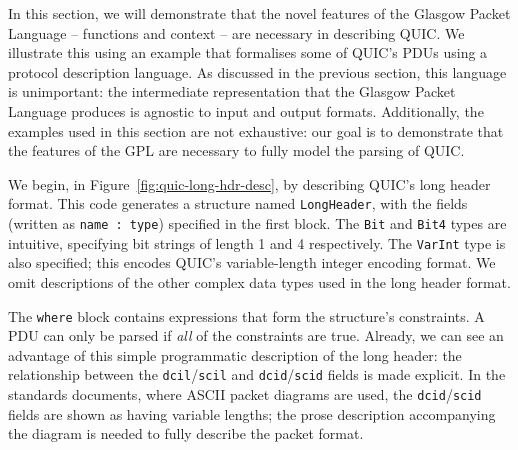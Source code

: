 \documentclass[10pt,sigconf]{acmart}
\begin{document}
In this section, we will demonstrate that the novel features of the Glasgow Packet
Language -- functions and context -- are necessary in describing QUIC. We illustrate this
using an example that formalises some of QUIC's PDUs using a protocol description
language. As discussed in the previous section, this language is unimportant: the
intermediate representation that the Glasgow Packet Language produces is agnostic to
input and output formats. Additionally, the examples used in this section are not
exhaustive: our goal is to demonstrate that the features of the GPL are necessary to
fully model the parsing of QUIC.

We begin, in Figure~\ref{fig:quic-long-hdr-desc}, by describing QUIC's long header
format. This code generates a structure named \texttt{LongHeader}, with the fields
(written as \texttt{name : type}) specified in the first block. The \texttt{Bit} and 
\texttt{Bit4} types are intuitive, specifying bit strings of length 1 and 4 respectively.
The \texttt{VarInt} type is also specified; this encodes QUIC's variable-length integer
encoding format. We omit descriptions of the other complex data types used in the
long header format.

The \texttt{where} block contains expressions that form the structure's constraints. A PDU
can only be parsed if \emph{all} of the constraints are true. Already, we can see an
advantage of this simple programmatic description of the long header: the relationship
between the \texttt{dcil}/\texttt{scil} and \texttt{dcid}/\texttt{scid} fields is made
explicit. In the standards documents, where ASCII packet diagrams are used, the
\texttt{dcid}/\texttt{scid} fields are shown as having variable lengths; the prose
description accompanying the diagram is needed to fully describe the packet format.
\end{document}
